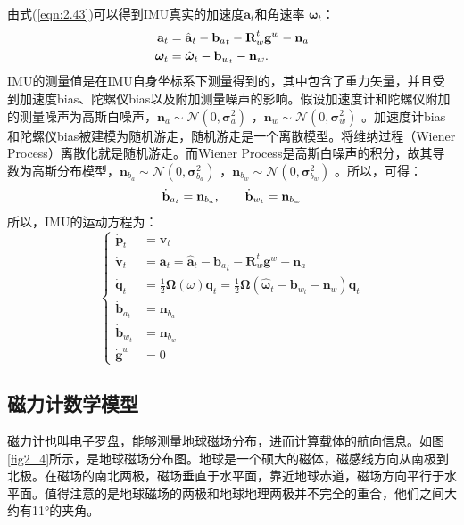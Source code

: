 由式(\ref{eqn:2.43})可以得到IMU真实的加速度$\mathbf{a}_t $和角速率 $\bm{\omega}_t $：
\begin{equation}
\label{eqn:2.44}
\setlength{\abovedisplayskip}{6pt}
\setlength{\belowdisplayskip}{6pt}
\begin{split}
\textbf{a}_t &=  \hat{\textbf{a}}_t - {\textbf{b}_a}_t - \textbf{R}_w^t\textbf{g}^w - \textbf{n}_a \\
\bm{\omega}_t   &=  \hat{\bm{\omega}}_t  - \mathbf{b}_{w_t} - \mathbf{n}_w.
\end{split}
\end{equation}
IMU的测量值是在IMU自身坐标系下测量得到的，其中包含了重力矢量，并且受到加速度bias、陀螺仪bias以及附加测量噪声的影响。假设加速度计和陀螺仪附加的测量噪声为高斯白噪声，$\mathbf{n}_a\sim\mathcal{N}(0,\bm{\sigma}_a^2) $ ，$\mathbf{n}_w\sim\mathcal{N}(0,\bm{\sigma}_w^2) $ 。加速度计bias和陀螺仪bias被建模为随机游走，随机游走是一个离散模型。将维纳过程（Wiener Process）离散化就是随机游走。而Wiener Process是高斯白噪声的积分，故其导数为高斯分布模型，$\mathbf{n}_{b_a}\sim\mathcal{N}(0,\bm{\sigma}_{b_a}^2) $ ，$\mathbf{n}_{b_w}\sim\mathcal{N}(0,\bm{\sigma}_{b_w}^2) $ 。所以，可得：
\begin{equation}
\label{eqn:2.45}
\setlength{\abovedisplayskip}{6pt}
\setlength{\belowdisplayskip}{6pt}
\dot{\mathbf{b}}_{a_t}=\mathbf{n}_{b_a},\qquad \dot{\mathbf{b}}_{w_t}=\mathbf{n}_{b_w}
\end{equation}
所以，IMU的运动方程为：
\begin{equation}
\label{eqn:2.46}
\left\{
\begin{aligned} \dot{\mathbf{p}}_{t} &=\mathbf{v}_{t} \\ 
\dot{\mathbf{v}}_{t} &=\mathbf{a}_{t} = \hat{\textbf{a}}_t - {\textbf{b}_a}_t - \textbf{R}_w^t\textbf{g}^w - \textbf{n}_a \\ 
\dot{\mathbf{q}}_{t} &=  \frac{1}{2} \bm{\Omega}(\omega) \mathbf{q}_{t} = \frac{1}{2} \bm{\Omega}\left(\hat{\bm{\omega}}_t  - \mathbf{b}_{w_t} - \mathbf{n}_w \right) \mathbf{q}_{t} \\ 
\dot{\mathbf{b}}_{a_t} &=\mathbf{n}_{b_a} \\ 
\dot{\mathbf{b}}_{w_t} &=\mathbf{n}_{b_w} \\ 
\dot{\mathbf{g}}^{w} &=0 \end{aligned}
\right.
\end{equation}
\subsection{磁力计数学模型}
磁力计也叫电子罗盘，能够测量地球磁场分布，进而计算载体的航向信息。如图\ref{fig2_4}所示，是地球磁场分布图。地球是一个硕大的磁体，磁感线方向从南极到北极。在磁场的南北两极，磁场垂直于水平面，靠近地球赤道，磁场方向平行于水平面。值得注意的是地球磁场的两极和地球地理两极并不完全的重合，他们之间大约有11°的夹角。

